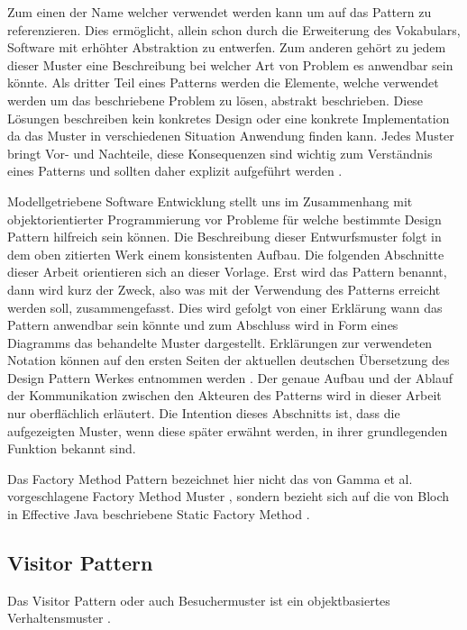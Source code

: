 \documentclass[12pt,oneside,a4paper,parskip]{scrbook}
\begin{document}
Zum einen der Name welcher verwendet werden kann um auf das Pattern zu referenzieren. Dies ermöglicht, allein schon durch die Erweiterung des Vokabulars, Software mit erhöhter Abstraktion zu entwerfen. Zum anderen gehört zu jedem dieser Muster eine Beschreibung bei welcher Art von Problem es anwendbar sein könnte. Als dritter Teil eines Patterns werden die Elemente, welche verwendet werden um das beschriebene Problem zu lösen, abstrakt beschrieben. Diese Lösungen beschreiben kein konkretes Design oder eine konkrete Implementation da das Muster in verschiedenen Situation Anwendung finden kann. Jedes Muster bringt Vor- und Nachteile, diese Konsequenzen sind wichtig zum Verständnis eines Patterns und sollten daher explizit aufgeführt werden \cite[S.30 f.]{gamma2015}.

Modellgetriebene Software Entwicklung stellt uns im Zusammenhang mit objektorientierter Programmierung vor Probleme für welche bestimmte Design Pattern hilfreich sein können. Die Beschreibung dieser Entwurfsmuster folgt in dem oben zitierten Werk einem konsistenten Aufbau. Die folgenden Abschnitte dieser Arbeit orientieren sich an dieser Vorlage. Erst wird das Pattern benannt, dann wird kurz der Zweck, also was mit der Verwendung des Patterns erreicht werden soll, zusammengefasst. Dies wird gefolgt von einer Erklärung wann das Pattern anwendbar sein könnte und zum Abschluss wird in Form eines Diagramms das behandelte Muster dargestellt. Erklärungen zur verwendeten Notation können auf den ersten Seiten der aktuellen deutschen Übersetzung des Design Pattern Werkes entnommen werden \cite[S. 8]{gamma2015}. Der genaue Aufbau und der Ablauf der Kommunikation zwischen den Akteuren des Patterns wird in dieser Arbeit nur oberflächlich erläutert. Die Intention dieses Abschnitts ist, dass die aufgezeigten Muster, wenn diese später erwähnt werden, in ihrer grundlegenden Funktion bekannt sind.

Das Factory Method Pattern bezeichnet hier nicht das von Gamma et al. vorgeschlagene Factory Method Muster \cite[S. 173ff.]{gamma2015}, sondern bezieht sich auf die von Bloch in Effective Java beschriebene Static Factory Method \cite[S. 5ff.]{bloch2017}.

\subsection{Visitor Pattern}

Das Visitor Pattern oder auch Besuchermuster ist ein objektbasiertes Verhaltensmuster \cite[S. 480]{gamma2015}.
\end{document}
